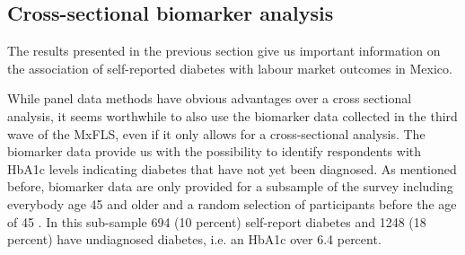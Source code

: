 \subsection{Cross-sectional biomarker analysis}

The results presented in the previous section give us important information
on the association of self-reported diabetes with labour market outcomes
in Mexico. 

While panel data methods have obvious advantages over a cross sectional analysis,
it seems worthwhile to also use the
biomarker data collected in the third wave of the \ac{MxFLS}, even
if it only allows for a cross-sectional analysis. The biomarker data
provide us with the possibility to identify respondents with \ac{HbA1c} levels indicating diabetes
that have not yet been diagnosed. As mentioned before, biomarker
data are only provided for a subsample of the survey including everybody
age 45 and older and a random selection of participants before the
age of 45 \citep{Crimmins2015}. In this sub-sample 694 (10 percent)
self-report diabetes and 1248 (18 percent) have undiagnosed diabetes,
i.e. an \ac{HbA1c} over 6.4 percent.

  
  